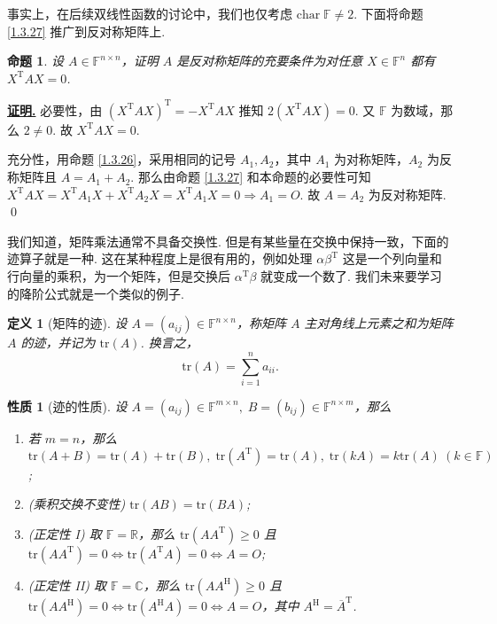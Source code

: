 \documentclass[10pt,openany]{article}
\theoremstyle{thmstyle} %
\theoremstyle{defstyle} %
\newtheorem{definition}[theorem]{定义}
\theoremstyle{prostyle} %
\newtheorem{proposition}[theorem]{命题}
\newtheorem{property}[theorem]{性质}
\theoremstyle{exastyle}
\theoremstyle{remstyle}
\renewenvironment{proof}[1][证明]{\par\underline{\textbf{#1.}} \;\fangsong}{\qed\par}
\newcommand{\T}{^{\text{T}}}
\newcommand{\Her}{^{\text{H}}}
\newcommand{\F}{\mathbb{F}}
\newcommand{\n}{^{n \times n}}
\newcommand{\tz}{\mathrm{char} \;}
\newcommand{\tr}{\mathrm{tr}}
\begin{document}
事实上，在后续双线性函数的讨论中，我们也仅考虑 \( \tz \F \neq 2 \). 下面将命题 \ref{1.3.27} 推广到反对称矩阵上.

\begin{proposition}
	设 \( A \in \F\n \)，证明 \( A \) 是反对称矩阵的充要条件为对任意 \( X \in \F^n \) 都有 \( X\T A X= 0 \).
\end{proposition}

\begin{proof}
	必要性，由 \( (X\T AX)\T= -X\T AX \) 推知 \( 2(X\T AX)=0 \). 又 \( \F \) 为数域，那么 \( 2 \neq 0 \). 故 \( X\T AX=0 \).
	
	充分性，用命题 \ref{1.3.26}，采用相同的记号 \( A_1,A_2 \)，其中 \( A_1 \) 为对称矩阵，\( A_2 \) 为反称矩阵且 \( A=A_1+A_2\). 那么由命题 \ref{1.3.27} 和本命题的必要性可知 \( X\T A X=X\T A_1 X+X\T A_2 X= X\T A_1 X=0 \Rightarrow A_1=O \). 故 \( A=A_2 \) 为反对称矩阵.
\end{proof}

\vspace{1ex}

我们知道，矩阵乘法通常不具备交换性. 但是有某些量在交换中保持一致，下面的迹算子就是一种. 这在某种程度上是很有用的，例如处理 \( \alpha\beta\T \) 这是一个列向量和行向量的乘积，为一个矩阵，但是交换后 \( \alpha\T\beta \) 就变成一个数了. 我们未来要学习的降阶公式就是一个类似的例子.

\begin{definition}[矩阵的迹]
	设 \( A=(a_{ij}) \in \F\n \)，称矩阵 \( A \) 主对角线上元素之和为矩阵 \( A \) 的迹，并记为 \( \tr(A) \). 换言之，
	\[ \tr(A)=\sum_{i=1}^{n} a_{ii}. \]
\end{definition}

\begin{property}[迹的性质]
	设 \( A=(a_{ij}) \in \F^{m \times n}, \; B=(b_{ij}) \in \F^{n \times m} \)，那么
	\begin{enumerate}[(1)]
		\item 若 \( m=n \)，那么 \( \tr(A+B)=\tr(A)+\tr(B), \; \tr(A\T)=\tr(A), \; \tr(kA)=k\tr(A) \ (k \in \F) \);
		\item (乘积交换不变性) \( \tr(AB)=\tr(BA) \);
		\item (正定性 I) 取 \( \F=\mathbb{R} \)，那么 \( \tr(AA\T) \geq 0 \) 且 \( \tr(AA\T)=0 \Leftrightarrow \tr(A\T A)=0 \Leftrightarrow A=O \);
		\item (正定性 II) 取 \( \F=\mathbb{C} \)，那么  \( \tr(AA\Her) \geq 0 \) 且  \( \tr(AA\Her)=0 \Leftrightarrow \tr(A\Her A)=0 \Leftrightarrow A=O \)，其中 \( A\Her= \overline{A}\T \).
	\end{enumerate}
\end{property}
\end{document}
